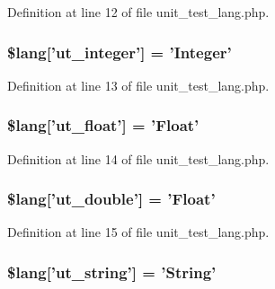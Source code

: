 Definition at line 12 of file unit\-\_\-test\-\_\-lang.\-php.

\hypertarget{unit__test__lang_8php_aa59dea4a9af41fde66d69436eadfd67b}{
\subsubsection[{\$lang}]{\setlength{\rightskip}{0pt plus 5cm}\$lang\mbox{[}'ut\-\_\-integer'\mbox{]} = 'Integer'}}\label{unit__test__lang_8php_aa59dea4a9af41fde66d69436eadfd67b}


Definition at line 13 of file unit\-\_\-test\-\_\-lang.\-php.

\hypertarget{unit__test__lang_8php_a0f8267057369911f12753bdef18154cf}{
\subsubsection[{\$lang}]{\setlength{\rightskip}{0pt plus 5cm}\$lang\mbox{[}'ut\-\_\-float'\mbox{]} = 'Float'}}\label{unit__test__lang_8php_a0f8267057369911f12753bdef18154cf}


Definition at line 14 of file unit\-\_\-test\-\_\-lang.\-php.

\hypertarget{unit__test__lang_8php_a4c75bfa3ef771d6952b724b23d752b8e}{
\subsubsection[{\$lang}]{\setlength{\rightskip}{0pt plus 5cm}\$lang\mbox{[}'ut\-\_\-double'\mbox{]} = 'Float'}}\label{unit__test__lang_8php_a4c75bfa3ef771d6952b724b23d752b8e}


Definition at line 15 of file unit\-\_\-test\-\_\-lang.\-php.

\hypertarget{unit__test__lang_8php_ab5097b676a29051de6c07955d59659d1}{
\subsubsection[{\$lang}]{\setlength{\rightskip}{0pt plus 5cm}\$lang\mbox{[}'ut\-\_\-string'\mbox{]} = 'String'}}\label{unit__test__lang_8php_ab5097b676a29051de6c07955d59659d1}


